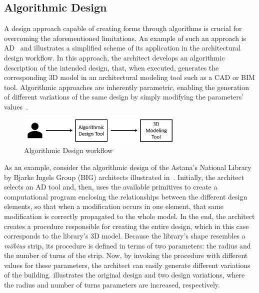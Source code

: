 \subsection{Algorithmic Design}

	A design approach capable of creating forms through algorithms is crucial for overcoming the aforementioned limitations. An example of such an approach is \ac{AD}~\cite{Branco2017AD} and  illustrates a simplified scheme of its application in the architectural design workflow. In this approach, the architect develops an algorithmic description of the intended design, that, when executed, generates the corresponding 3D model in an architectural modeling tool such as a \ac{CAD} or \ac{BIM} tool. Algorithmic approaches are inherently parametric, enabling the generation of different variations of the same design by simply modifying the parameters' values~\cite{Leitao2014GD}. 
	
\begin{figure}[htbp]
\centering
\includegraphics[width=0.70\textwidth]{./Images/Introduction/AlgorithmicArchitecturalDesign.png}
\caption[General view of the Algorithmic Design Approach]{Algorithmic Design workflow}
\label{fig:algorithmicdesign}
\end{figure}
	
	As an example, consider the algorithmic design of the Astana's National Library by Bjarke Ingels Group (BIG) architects illustrated in~. Initially, the architect selects an \ac{AD} tool and, then, uses the available primitives to create a computational program enclosing the relationships between the different design elements, so that when a modification occurs in one element, that same modification is correctly propagated to the whole model. In the end, the architect creates a procedure responsible for creating the entire design, which in this case corresponds to the library's 3D model. Because the library's shape resembles a \textit{möbius} strip, its procedure is defined in terms of two parameters: the radius and the number of turns of the strip. Now, by invoking the procedure with different values for these parameters, the architect can easily generate different variations of the building.  illustrates the original design and two design variations, where the radius and number of turns parameters are increased, respectively. 
	
